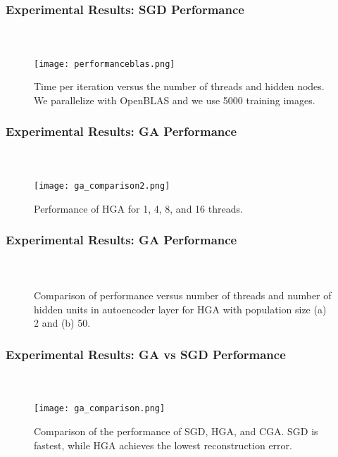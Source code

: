 \begin{frame}[t]
	\frametitle{Experimental Results: SGD Performance}
	\framesubtitle{~~}  %

	\begin{figure}[h]
		\centering
		\texttt{[image: performanceblas.png]}
		\caption{Time per iteration versus the number of threads and hidden nodes. We parallelize with OpenBLAS and we use 5000 training images.}
		\label{fig:performanceblas}
	\end{figure}

\end{frame}


\begin{frame}[t]
	\frametitle{Experimental Results: GA Performance}
	\framesubtitle{~~}  %

	\begin{figure}[h] \centering
		\texttt{[image: ga\_comparison2.png]}
		\caption{Performance of HGA for 1, 4, 8, and 16 threads.}
		\label{fig:ga_comparison2}
	\end{figure}


\end{frame}


\begin{frame}[t]
	\frametitle{Experimental Results: GA Performance}
	\framesubtitle{~~}  %

\begin{figure}[H]
  \centering
  \caption{Comparison of performance versus number of threads and number of hidden units in autoencoder layer for HGA with population size (a) 2 and (b) 50.}
  \label{fig:ga_comparison3}
\end{figure}


\end{frame}


\begin{frame}[t]
	\frametitle{Experimental Results: GA vs SGD Performance}
	\framesubtitle{~~}  %

\begin{figure}[h] \centering
  \texttt{[image: ga\_comparison.png]}
  \caption{Comparison of the performance of SGD, HGA, and CGA. SGD is fastest, while HGA achieves the lowest reconstruction error.}
  \label{fig:ga_comparison}
\end{figure}

\end{frame}

